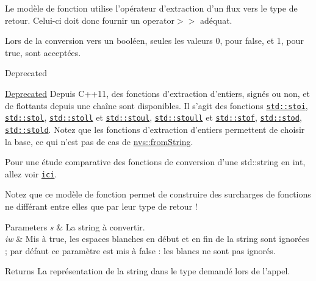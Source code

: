 Le modèle de fonction utilise l'opérateur d'extraction d'un flux vers le type de retour. Celui-\/ci doit donc fournir un {\ttfamily operator$>$$>$} adéquat.

Lors de la conversion vers un booléen, seules les valeurs 0, pour {\ttfamily false}, et 1, pour {\ttfamily true}, sont acceptées.

\begin{DoxyRefDesc}{Deprecated}
\item[\hyperlink{deprecated__deprecated000003}{Deprecated}]Depuis C++11, des fonctions d'extraction d'entiers, signés ou non, et de flottants depuis une chaîne sont disponibles. Il s'agit des fonctions \href{http://en.cppreference.com/w/cpp/string/basic_string/stol}{\tt {\ttfamily std\+::stoi}}, \href{http://en.cppreference.com/w/cpp/string/basic_string/stol}{\tt {\ttfamily std\+::stol}}, \href{http://en.cppreference.com/w/cpp/string/basic_string/stol}{\tt {\ttfamily std\+::stoll}} et \href{http://en.cppreference.com/w/cpp/string/basic_string/stoul}{\tt {\ttfamily std\+::stoul}}, \href{http://en.cppreference.com/w/cpp/string/basic_string/stoul}{\tt {\ttfamily std\+::stoull}} et \href{http://en.cppreference.com/w/cpp/string/basic_string/stof}{\tt {\ttfamily std\+::stof}}, \href{http://en.cppreference.com/w/cpp/string/basic_string/stof}{\tt {\ttfamily std\+::stod}}, \href{http://en.cppreference.com/w/cpp/string/basic_string/stof}{\tt {\ttfamily std\+::stold}}. Notez que les fonctions d'extraction d'entiers permettent de choisir la base, ce qui n'est pas de cas de \hyperlink{namespacenvs_a96cda281b4b965c337c5a6bda3262a51}{nvs\+::from\+String}.\end{DoxyRefDesc}


Pour une étude comparative des fonctions de conversion d'une {\ttfamily std\+::string} en {\ttfamily int}, allez voir \href{http://www.kumobius.com/2013/08/c-string-to-int/}{\tt ici}.

Notez que ce modèle de fonction permet de construire des surcharges de fonctions ne différant entre elles que par leur type de retour !


\begin{DoxyParams}{Parameters}
{\em s} & La {\ttfamily string} à convertir. \\
\hline
{\em iw} & Mis à {\ttfamily true}, les espaces blanches en début et en fin de la {\ttfamily string} sont ignorées ; par défaut ce paramètre est mis à {\ttfamily false} \+: les blancs ne sont pas ignorés.\\
\hline
\end{DoxyParams}
\begin{DoxyReturn}{Returns}
La représentation de la {\ttfamily string} dans le type demandé lors de l'appel.
\end{DoxyReturn}

